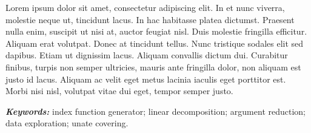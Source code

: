 Lorem ipsum dolor sit amet, consectetur adipiscing elit. In et nunc viverra, molestie neque ut, tincidunt lacus. In hac habitasse platea dictumst. Praesent nulla enim, suscipit ut nisi at, auctor feugiat nisl. Duis molestie fringilla efficitur. Aliquam erat volutpat. Donec at tincidunt tellus. Nunc tristique sodales elit sed dapibus. Etiam ut dignissim lacus. Aliquam convallis dictum dui. Curabitur finibus, turpis non semper ultricies, mauris ante fringilla dolor, non aliquam est justo id lacus. Aliquam ac velit eget metus lacinia iaculis eget porttitor est. Morbi nisi nisl, volutpat vitae dui eget, tempor semper justo.

\textit{\textbf{Keywords:}} index function generator; linear decomposition; argument reduction; data exploration; unate covering.

